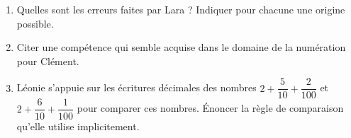 \begin{exercice}[CRPE 2015 G1]
\begin{center}
   \hspace*{-0.5cm}
   \hspace*{-0.5cm}
\end{center}
\begin{enumerate}
   \item Quelles sont les erreurs faites par Lara ? Indiquer pour chacune une origine possible.
   \item Citer une compétence qui semble acquise dans le domaine de la numération pour Clément.
   \item Léonie s'appuie sur les écritures décimales des nombres $2+\dfrac{5}{10}+\dfrac{2}{100}$ et $2+\dfrac{6}{10}+\dfrac{1}{100}$ pour comparer ces nombres. Énoncer la règle de comparaison qu'elle utilise implicitement.
\end{enumerate}
\end{exercice}

